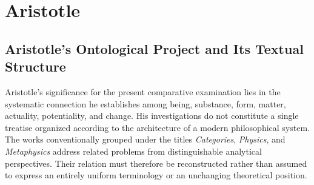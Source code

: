 %
%
%
%
%

\section{Aristotle}
\label{sec:ch08-aristotle}



\subsection{Aristotle's Ontological Project and Its Textual Structure}

\label{para:VS.B01.P01.C08.S05.SS01.P001}

Aristotle's significance for the present comparative examination
lies in the systematic connection he establishes among being,
substance, form, matter, actuality, potentiality, and change.
His investigations do not constitute a single treatise organized
according to the architecture of a modern philosophical system.
The works conventionally grouped under the titles
\textit{Categories}, \textit{Physics}, and \textit{Metaphysics}
address related problems from distinguishable analytical
perspectives. Their relation must therefore be reconstructed
rather than assumed to express an entirely uniform terminology
or an unchanging theoretical position. \cite{AristotleCategories,
AristotlePhysics,AristotleMetaphysics}

